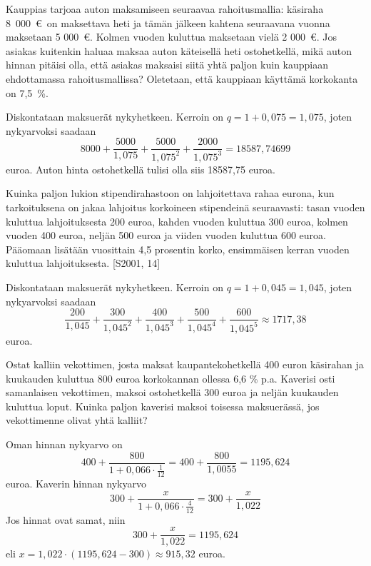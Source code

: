 \documentclass[a4paper,10pt]{article}\usepackage[]{graphicx}\usepackage[]{color}
\begin{document}
\begin{question} 
Kauppias tarjoaa auton maksamiseen seuraavaa rahoitusmallia: käsiraha 8~000~\euro \ on maksettava heti ja tämän
jälkeen kahtena seuraavana vuonna maksetaan 5 000~\euro. Kolmen vuoden kuluttua maksetaan vielä 2 000~\euro.
Jos asiakas kuitenkin haluaa maksaa auton käteisellä heti ostohetkellä, mikä auton hinnan pitäisi olla, että asiakas
maksaisi siitä yhtä paljon kuin kauppiaan ehdottamassa rahoitusmallissa? Oletetaan, että kauppiaan käyttämä korkokanta on 7{,}5~\%.
\end{question}
\begin{solution}
    Diskontataan maksuerät nykyhetkeen. Kerroin on \(q= 1+0,075 = 1,075\), joten nykyarvoksi saadaan
    \[
        8000 + \frac{5000}{1,075} + \frac{5000}{1,075^2} + \frac{2000}{1,075^3} = 18587,74699
    \]
    euroa. Auton hinta ostohetkellä tulisi olla siis 18587,75 euroa.
\end{solution}


\begin{question} Kuinka paljon lukion stipendirahastoon on lahjoitettava rahaa eurona, kun tarkoituksena on jakaa lahjoitus korkoineen
stipendeinä seuraavasti: tasan vuoden kuluttua lahjoituksesta 200 euroa, kahden vuoden kuluttua 300 euroa,
kolmen vuoden 400 euroa, neljän 500 euroa ja viiden vuoden kuluttua 600 euroa. Pääomaan lisätään vuosittain 4,5 prosentin korko,
ensimmäisen kerran vuoden kuluttua lahjoituksesta. [S2001, 14]
\end{question}\begin{solution}
    Diskontataan maksuerät nykyhetkeen. Kerroin on \(q= 1+0,045 = 1,045\), joten nykyarvoksi saadaan
    \[
        \frac{200}{1,045} + \frac{300}{1,045^2} + \frac{400}{1,045^3} + \frac{500}{1,045^4} + \frac{600}{1,045^5} \approx 1717,38
    \]
    euroa.
\end{solution}

\begin{question} Ostat kalliin vekottimen, josta maksat kaupantekohetkellä 400 euron käsirahan ja kuukauden kuluttua 800 euroa korkokannan ollessa 6{,}6 \% p.a.
Kaverisi osti samanlaisen vekottimen, maksoi ostohetkellä 300 euroa ja neljän kuukauden kuluttua loput.
Kuinka paljon kaverisi maksoi toisessa maksuerässä, jos vekottimenne olivat yhtä kalliit?
\end{question}\begin{solution}
    Oman hinnan nykyarvo on
    \[
        400 + \frac{800}{1+0,066\cdot\frac{1}{12}} = 400 + \frac{800}{1,0055} = 1195,624
    \]
    euroa. Kaverin hinnan nykyarvo
    \[
        300 + \frac{x}{1+0,066\cdot\frac{4}{12}} = 300 + \frac{x}{1,022}
    \]
    Jos hinnat ovat samat, niin
    \[
        300 + \frac{x}{1,022} =  1195,624
    \]
    eli \( x = 1,022\cdot(1195,624-300)\approx 915,32\) euroa.
\end{solution}
\end{document}
